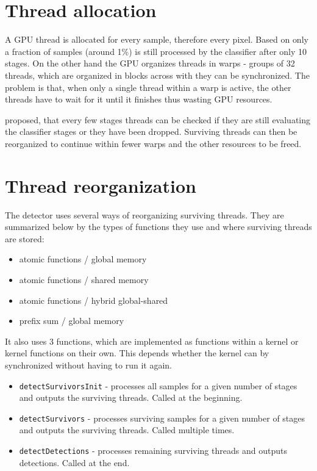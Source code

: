 \section{Thread allocation}

A GPU thread is allocated for every sample, therefore every pixel. Based on \cite{herout-realtime-cuda} only a fraction of samples (around 1\%) is still processed by the classifier after only 10 stages. On the other hand the GPU organizes threads in warps - groups of 32 threads, which are organized in blocks across with they can be synchronized. The problem is that, when only a single thread within a warp is active, the other threads have to wait for it until it finishes thus wasting GPU resources.

\cite{herout-realtime-cuda} proposed, that every few stages threads can be checked if they are still evaluating the classifier stages or they have been dropped. Surviving threads can then be reorganized to continue within fewer warps and the other resources to be freed.

\section{Thread reorganization}\label{subsec:thread-reorganization}

The detector uses several ways of reorganizing surviving threads. They are summarized below by the types of functions they use and where surviving threads are stored:

\begin{itemize}
	\item atomic functions / global memory
	\item atomic functions / shared memory
	\item atomic functions / hybrid global-shared
	\item prefix sum / global memory
\end{itemize}

It also uses 3 functions, which are implemented as functions within a kernel or kernel functions on their own. This depends whether the kernel can by synchronized without having to run it again.

\begin{itemize}
	\item \verb|detectSurvivorsInit| - processes all samples for a given number of stages and outputs the surviving threads. Called at the beginning.
	\item \verb|detectSurvivors| - processes surviving samples for a given number of stages and outputs the surviving threads. Called multiple times.
	\item \verb|detectDetections| - processes remaining surviving threads and outputs detections. Called at the end.
\end{itemize}

